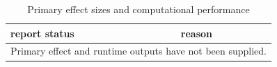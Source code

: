 \begin{table}[htbp]
\centering
\caption{Primary effect sizes and computational performance}
\label{tab:effects-runtime}
\begin{tabular}{ll}
\hline
report status & reason \\
\hline
\multicolumn{2}{l}{Primary effect and runtime outputs have not been supplied.} \\
\hline
\end{tabular}
\end{table}
